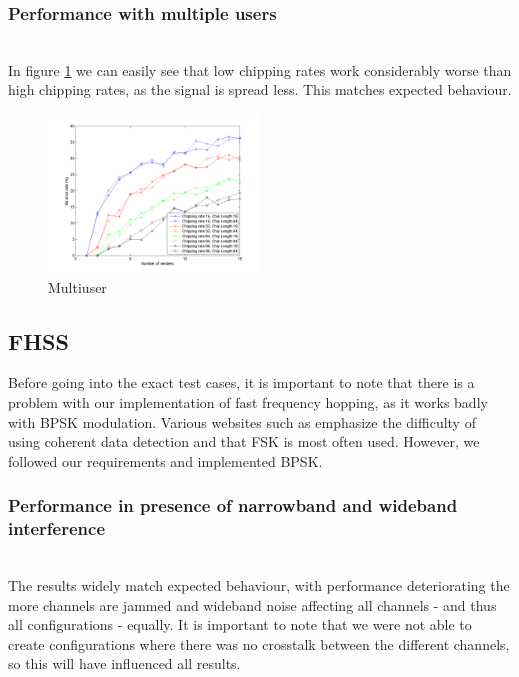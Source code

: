 		\subsubsection{Performance with multiple users}~\\
		
		In figure \ref{fig:dsss_multiuser} we can easily see that low chipping rates work considerably worse than high chipping rates, as the signal is spread less. This matches expected behaviour. 
		\begin{figure}[H]
			\includegraphics[width=0.5\textwidth]{imgs/results/plot_mode_dsss-test_numSenders-rep_20-dataRate_8-dataLength_128.png}
			\caption{Multiuser}
			\label{fig:dsss_multiuser}
		\end{figure}
		
		
	
	\subsection{FHSS}
	
	Before going into the exact test cases, it is important to note that there is a problem with our implementation of fast frequency hopping, as it works badly with BPSK modulation. Various websites such as \cite{web-nl} emphasize the difficulty of using coherent data detection and that FSK is most often used. However, we followed our requirements and implemented BPSK.
		\subsubsection{Performance in presence of narrowband and wideband interference}~\\
		
		The results widely match expected behaviour, with performance deteriorating the more channels are jammed and wideband noise affecting all channels - and thus all configurations - equally. It is important to note that we were not able to create configurations where there was no crosstalk between the different channels, so this will have influenced all results.
		
